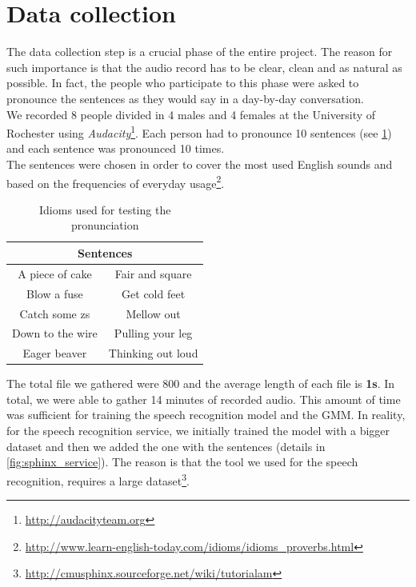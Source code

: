 \section{Data collection}
\label{sec:data_collection}

The data collection step is a crucial phase of the entire project. The reason for such importance is that the audio record has to be clear, clean and as natural as possible. In fact, the people who participate to this phase were asked to pronounce the sentences as they would say in a day-by-day conversation. \\

\noindent We recorded 8 people divided in 4 males and 4 females at the University of Rochester using \textit{Audacity}\footnote{\url{http://audacityteam.org}}. Each person had to pronounce 10 sentences (see \ref{table:sentences}) and each sentence was pronounced 10 times. \\
\noindent The sentences were chosen in order to cover the most used English sounds and based on the frequencies of everyday usage\footnote{\url{http://www.learn-english-today.com/idioms/idioms_proverbs.html}}. 

\begin{table}[!ht]
	\centering
	\begin{tabular}{|c|c|}
		\hline
		\multicolumn{2}{|c|}{Sentences}      \\ \hline
		A piece of cake  & Fair and square   \\ \hline
		Blow a fuse      & Get cold feet     \\ \hline
		Catch some zs    & Mellow out        \\ \hline
		Down to the wire & Pulling your leg  \\ \hline
		Eager beaver     & Thinking out loud \\ \hline
	\end{tabular}
	\caption{Idioms used for testing the pronunciation}
	\label{table:sentences}
\end{table}

\noindent The total file we gathered were 800 and the average length of each file is \textbf{1s}. In total, we were able to gather 14 minutes of recorded audio. This amount of time was sufficient for training the speech recognition model and the GMM. In reality, for the speech recognition service, we initially trained the model with a bigger dataset and then we added the one with the sentences (details in \ref{fig:sphinx_service}). The reason is that the tool we used for the speech recognition, requires a large dataset\footnote{\url{http://cmusphinx.sourceforge.net/wiki/tutorialam}}.

